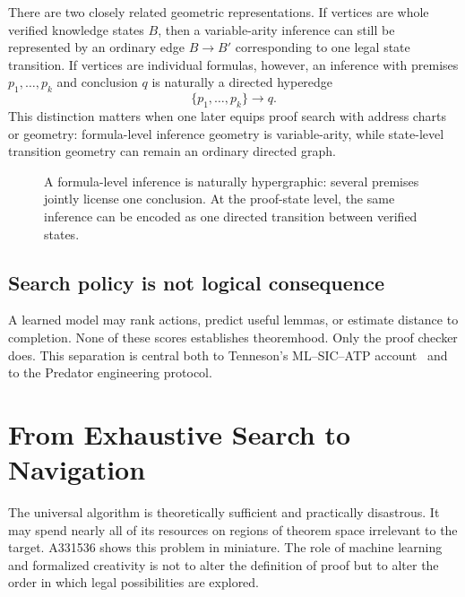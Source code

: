 \documentclass[11pt,oneside]{book}
\theoremstyle{definition}
\theoremstyle{remark}
\begin{document}
There are two closely related geometric representations. If vertices are whole verified knowledge states $B$, then a variable-arity inference can still be represented by an ordinary edge $B\to B'$ corresponding to one legal state transition. If vertices are individual formulas, however, an inference with premises $p_1,\ldots,p_k$ and conclusion $q$ is naturally a directed hyperedge
\[
\{p_1,\ldots,p_k\}\longrightarrow q.
\]
This distinction matters when one later equips proof search with address charts or geometry: formula-level inference geometry is variable-arity, while state-level transition geometry can remain an ordinary directed graph.

\begin{figure}[ht]
\centering
{}
\caption{A formula-level inference is naturally hypergraphic: several premises jointly license one conclusion. At the proof-state level, the same inference can be encoded as one directed transition between verified states.}
\label{fig:proofgraph}
\end{figure}

\section{Search policy is not logical consequence}
A learned model may rank actions, predict useful lemmas, or estimate distance to completion. None of these scores establishes theoremhood. Only the proof checker does. This separation is central both to Tenneson's ML--SIC--ATP account~\cite{tennesonML} and to the Predator engineering protocol.

\chapter{From Exhaustive Search to Navigation}\label{ch:navigation}
The universal algorithm is theoretically sufficient and practically disastrous. It may spend nearly all of its resources on regions of theorem space irrelevant to the target. A331536 shows this problem in miniature. The role of machine learning and formalized creativity is not to alter the definition of proof but to alter the order in which legal possibilities are explored.
\end{document}
